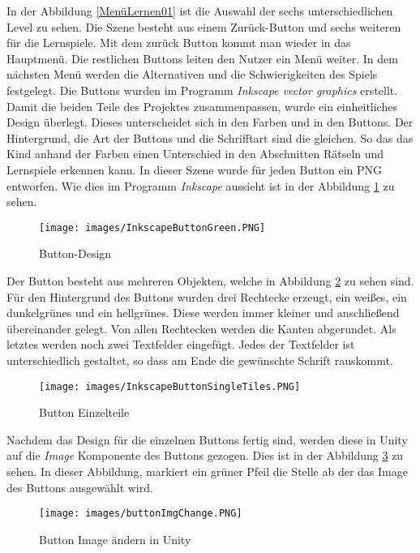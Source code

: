 In der Abbildung \ref{MenüLernen01} ist die Auswahl der sechs unterschiedlichen Level zu sehen. Die Szene besteht aus einem Zurück-Button und sechs weiteren für die Lernspiele. Mit dem zurück Button kommt man wieder in das Hauptmenü. Die restlichen Buttons leiten den Nutzer ein Menü weiter. In dem nächsten Menü werden die Alternativen und die Schwierigkeiten des Spiels festgelegt. Die Buttons wurden im Programm \textit{Inkscape vector graphics} erstellt. Damit die beiden Teile des Projektes zusammenpassen, wurde ein einheitliches Design überlegt. Dieses unterscheidet sich in den Farben und in den Buttons. Der Hintergrund, die Art der Buttons und die Schrifftart sind die gleichen. So das das Kind anhand der Farben einen Unterschied in den Abschnitten Rätseln und Lernspiele erkennen kann. In dieser Szene wurde für jeden Button ein PNG entworfen. Wie dies im Programm \textit{Inkscape} aussieht ist in der Abbildung \ref{ButtonInkscape} zu sehen.\\
\begin{figure}[htbp]
  \centering
  \texttt{[image: images/InkscapeButtonGreen.PNG]}
  \caption{Button-Design}
  \label{ButtonInkscape}
\end{figure}
Der Button besteht aus mehreren Objekten, welche in Abbildung \ref{ButtonInkscapeSingleTiles} zu sehen sind. Für den Hintergrund des Buttons wurden drei Rechtecke erzeugt, ein weißes, ein dunkelgrünes und ein hellgrünes. Diese werden immer kleiner und anschließend übereinander gelegt. Von allen Rechtecken werden die Kanten abgerundet. Als letztes werden noch zwei Textfelder eingefügt. Jedes der Textfelder ist unterschiedlich gestaltet, so dass am Ende die gewünschte Schrift rauskommt. 
\begin{figure}[htbp]
  \centering
  \texttt{[image: images/InkscapeButtonSingleTiles.PNG]}
  \caption{Button Einzelteile}
  \label{ButtonInkscapeSingleTiles}
\end{figure}
Nachdem das Design für die einzelnen Buttons fertig sind, werden diese in Unity auf die \textit{Image} Komponente des Buttons gezogen. Dies ist in der Abbildung \ref{UnityButtonImgChange} zu sehen.
In dieser Abbildung, markiert ein grüner Pfeil die Stelle ab der das Image des Buttons ausgewählt wird.
\begin{figure}[htbp]
  \centering
  \texttt{[image: images/buttonImgChange.PNG]}
  \caption{Button Image ändern in Unity}
  \label{UnityButtonImgChange}
\end{figure}
